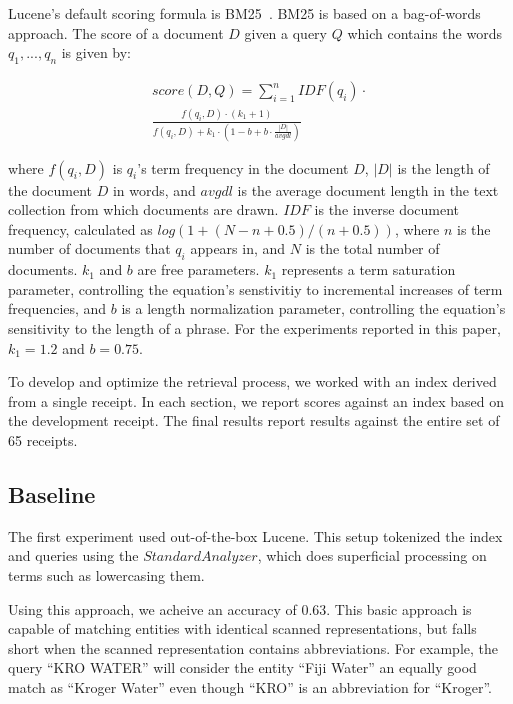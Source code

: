 \documentclass[11pt,a4paper]{article}
\begin{document}
Lucene's default scoring formula is
BM25~\cite{robertson:2009}.  BM25 is based on a
bag-of-words approach. The score of a document $D$ given a query $Q$
which contains the words $q_1, ..., q_n$ is given by: 

\begin{equation}
\begin{split}
  \label{eq:bm25}
score(D,Q) = \sum_{i=1}^{n} IDF(q_i) \cdot \\
  \frac{f(q_i, D) \cdot (k_1 + 1)}{f(q_i, D) + k_1 \cdot (1 - b + b
    \cdot \frac{|D|}{avgdl})}
\end{split}
\end{equation}

where $f(q_i, D)$ is $q_i$'s term frequency in the document $D$, $|D|$
is the length of the document $D$ in words,
and $avgdl$ is the average
document length in the text collection from which documents are
drawn.
$IDF$ is the inverse document frequency, calculated as $log(1 + (N - n + 0.5) / (n + 0.5))$, 
where $n$ is the number of documents that $q_i$ appears in, and $N$
is the total number of documents.
$k_1$ and $b$ are free parameters.  $k_1$ represents a term
saturation parameter, controlling the equation's senstivitiy to
incremental increases of term frequencies, and $b$ is a length
normalization parameter, controlling the equation's sensitivity
to the length of a phrase.  For the experiments reported in this
paper, $k_1 = 1.2$ and $b = 0.75$.

To develop and optimize the retrieval process, we worked with an index
derived from a single receipt.
In each section, we report scores against an index based on the
development receipt.  The final results report results against
the entire set of 65 receipts.

\subsection{Baseline}

The first experiment used out-of-the-box Lucene.  This setup tokenized
the index and queries using the $StandardAnalyzer$, which does
superficial processing on terms such as lowercasing them.

Using this approach, we acheive an accuracy of 0.63.
This basic approach is capable of matching entities with identical
scanned representations, but falls short when the scanned
representation contains abbreviations.  For example, the
query ``KRO WATER'' will consider the entity ``Fiji Water''
an equally good match as ``Kroger Water'' even though ``KRO''
is an abbreviation for ``Kroger''.
\end{document}
